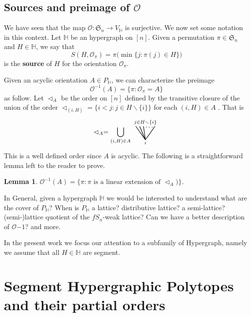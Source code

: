 \documentclass[reqno]{amsart}
\newtheorem{lemma}[theorem]{Lemma}
\theoremstyle{definition}
\newcommand{\ssm}{\smallsetminus} %
\newcommand{\defn}[1]{\textbf{\textsf{\color{PineGreen} #1}}} %
\newcommand{\fS}{\mathfrak{S}} %
\newcommand{\less}{\vartriangleleft} %
\newcommand{\Or}{\mathcal O}  %
\newcommand{\HH}{\mathbb H}  %
\begin{document}
\subsection{Sources and preimage of $\Or$} 
\label{subsec:notation}

We have seen that the map $\Or \colon \fS_n \to V_{\HH}$ is surjective.
We now set some notation in this context. Let $\HH$ be  an hypergraph on $[n]$. Given a permutation $\pi\in\fS_n$ and $H\in \HH$,
we say that 
\begin{equation}\label{eq:source}
	S(H,\Or_\pi)=\pi\big( \min\{j:\pi(j)\in H\}\big)
\end{equation}
is the \defn{source} of $H$ for the orientation $\Or_\pi$. 

Given an acyclic orientation $A\in P_\HH$,  we can characterize the preimage 
	$$ \Or^{-1}(A)=\{ \pi : \Or_\pi=A\}$$
as follow. Let $\less_A$ be the order on $[n]$ defined by the transitive closure of the union of 
the order $\less_{(i,H)}=\big\{ i< j : j\in H\ssm\{i\}\big\}$ for each $(i,H)\in A$ . That is
 	$$\less_A =  \bigcup_{(i,H)\in A} 
	\begin{tikzpicture}[scale=1,baseline=.0cm]
	\node at (0,-.45) {$\scriptstyle i$};
	\node at (0,.6) {$\scriptstyle j\in H\ssm \{i\}$};
	\node at (.2,.35) {$\ldots$};
	\draw [thick] (0,-.3)--(-.5,.4); 
	\draw [thick] (0,-.3)--(-.3,.4); 
	\draw [thick] (0,-.3)--(-.1,.4); 
	\draw [thick] (0,-.3)--(.5,.4); 
	\end{tikzpicture}
	$$
This is a well defined order since $A$ is acyclic. The following is a straightforward lemma left to the reader to prove.
\begin{lemma}\label{lem:prepi}   $ \Or^{-1}(A) =\big\{ \pi : \pi \text{ is a linear extension of }  \less_A)\big\}$.
\end{lemma}


In General, given a hypergraph $\HH$ we would be interested to understand what are the cover of $P_{\HH}$? 
When is $P_{\HH}$ a lattice? distributive lattice? a semi-lattice? (semi-)lattice quotient of the $fS_n$-weak lattice?
Can we have a better description of $\Or{-1}$? and more.

In the present work we focus our attention to a subfamily of Hypergraph, namely we assume that all $H\in \HH$ are segment.


\section{Segment Hypergraphic Polytopes and their partial orders}
\label{sec:IHP}
\end{document}
